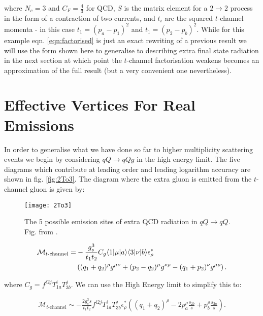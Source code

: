 		where $N_c=3$ and $C_F=\frac{4}{3}$ for QCD, $S$ is the matrix element for a $2\rightarrow2$ process
		in the form of a contraction of two currents, and $t_i$ are the squared $t$-channel momenta - in this
		case $t_1=(p_a-p_1)^2$ and $t_1=(p_2-p_b)^2$.  While for this example eqn. \eqref{eqn:factorised} is
		just an exact rewriting of a previous result we will use the form shown here to generalise to describing extra
		final state radiation in the next section at which point the $t$-channel factorisation weakens becomes an
		approximation of the full result (but a very convenient one nevertheless).

	\section{Effective Vertices For Real Emissions}
		\label{sub:effectiveVertices}

		In order to generalise what we have done so far to higher multiplicity scattering events we begin
		by considering $qQ\rightarrow qQg$ in the high energy limit.  The five diagrams which contribute at
		leading order and leading logarithm accuracy are shown in fig. \eqref{fig:2To3}.  The diagram
		where the extra gluon is emitted from the $t$-channel gluon is given by:

		\begin{figure}[hbt]
			\begin{center}
			\texttt{[image: 2To3]}
			\caption{The 5 possible emission sites of extra QCD radiation in $qQ\rightarrow qQ$.
			Fig. from \cite{Andersen:2009nu}.}
			\label{fig:2To3}
			\end{center}
		\end{figure}

		\begin{align}
			\mathcal{M}_{t\text{-channel}} = &-\frac{g_s^3}{t_1t_2}C_g\langle 1 | \mu | a \rangle\langle 3 | \nu | b \rangle
			\epsilon^*_\rho\\&\left((q_1 + q_2)^\rho g^{\mu\nu} + (p_2 - q_2)^\mu g^{\nu\rho} - (q_1 + p_2)^\nu g^{\mu\rho}\right).
		\end{align}

		where $C_g = f^{i2j}T^i_{1a}T^j_{3b}$.  We can use the High Energy limit to simplify this to:

		\begin{align}
			\mathcal{M}_{t\text{-channel}} \sim -\frac{2g_s^3s}{t_1t_2}f^{i2j}T^i_{1a}T^j_{3b}\epsilon^*_\rho
			\left((q_1 + q_2)^\rho - 2p_a^\rho\frac{s_{2b}}{s} + p_b^\rho\frac{s_{2a}}{s}\right).
		\end{align}

